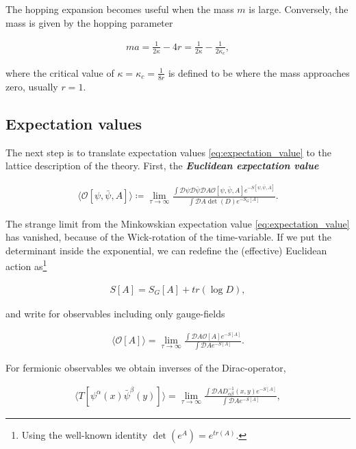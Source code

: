 \documentclass{article}
\theoremstyle{plain} %
\theoremstyle{convention} %
\theoremstyle{remark} %
\def\df#1{\textbf{\textit{#1}}}
\numberwithin{equation}{section}
\begin{document}
The hopping expansion becomes useful when the mass $m$ is large. Conversely, the mass is given by the hopping parameter

\begin{align*}
    m a = \frac{1}{2 \kappa} - 4r = \frac{1}{2 \kappa} - \frac{1}{2 \kappa_c},
\end{align*}

where the critical value of $\kappa = \kappa_c = \frac{1}{8r}$ is defined to be where the mass approaches zero, usually $r=1$.

\subsection{Expectation values}

The next step is to translate expectation values \eqref{eq:expectation_value} to the lattice description of the theory. First, the \df{Euclidean expectation value}

\begin{align*}
    \langle \mathcal{O}[\psi, \bar{\psi}, A] \rangle \coloneqq \lim_{\tau \to \infty} \frac{ \int \mathcal{D} \psi \mathcal{D} \bar{\psi} \mathcal{D} A \mathcal{O}[\psi, \bar{\psi}, A] e^{-S[\psi,\bar{\psi},A]} }{ \int \mathcal{D} A \det(D) e^{-S_G[A]} }.
\end{align*}

The strange limit from the Minkowskian expectation value \eqref{eq:expectation_value} has vanished, because of the Wick-rotation of the time-variable. If we put the determinant inside the exponential, we can redefine the (effective) Euclidean action as\footnote{Using the well-known identity $\det(e^A) = e^{tr(A)}$.}

\begin{align}
    S[A] = S_G[A] + tr(\log D), \label{eq:eucl_action}
\end{align}

and write for observables including only gauge-fields

\begin{align*}
    \langle \mathcal{O}[A] \rangle = \lim_{\tau \to \infty} \frac{ \int \mathcal{D} A \mathcal{O}[A] e^{-S[A]} }{ \int \mathcal{D} A e^{-S[A]} }.
\end{align*}

For fermionic observables we obtain inverses of the Dirac-operator,

\begin{align*}
    \langle T[\psi^{\alpha}(x) \bar{\psi}^{\beta}(y)] \rangle = \lim_{\tau \to \infty} \frac{ \int \mathcal{D} A D_{\alpha \beta}^{-1}(x,y) e^{-S[A]} }{ \int \mathcal{D} A e^{-S[A]} },
\end{align*}
\end{document}
